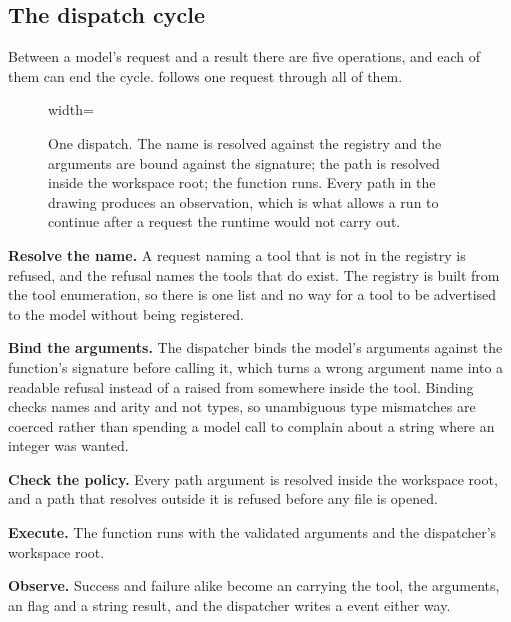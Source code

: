 \subsection{The dispatch cycle}
\label{sec:boundary-dispatch}

Between a model's request and a result there are five operations, and each of them can end the
cycle.  follows one request through all of them.

\begin{figure}[htbp]
  \centering
  \begin{adjustbox}{width=\linewidth}\end{adjustbox}
  \caption{One dispatch. The name is resolved against the registry and the arguments are bound
  against the signature; the path is resolved inside the workspace root; the function runs. Every
  path in the drawing produces an observation, which is what allows a run to continue after a
  request the runtime would not carry out.}
  \label{fig:dispatch-cycle}
\end{figure}

\bi

\item \textbf{Resolve the name.} A request naming a tool that is not in the registry is refused, and
the refusal names the tools that do exist. The registry is built from the tool enumeration, so
there is one list and no way for a tool to be advertised to the model without being registered.

\item \textbf{Bind the arguments.} The dispatcher binds the model's arguments against the function's
signature before calling it, which turns a wrong argument name into a readable refusal instead of a
 raised from somewhere inside the tool. Binding checks names and arity and not
types, so unambiguous type mismatches are coerced rather than spending a model call to complain
about a string where an integer was wanted.

\item \textbf{Check the policy.} Every path argument is resolved inside the workspace root, and a
path that resolves outside it is refused before any file is opened.

\item \textbf{Execute.} The function runs with the validated arguments and the dispatcher's
workspace root.

\item \textbf{Observe.} Success and failure alike become an  carrying the tool,
the arguments, an  flag and a string result, and the dispatcher writes a
 event either way.

